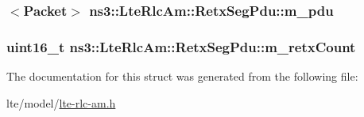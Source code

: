 \subsubsection[{\texorpdfstring{m\+\_\+pdu}{m_pdu}}]{$<${\bf Packet}$>$ ns3\+::\+Lte\+Rlc\+Am\+::\+Retx\+Seg\+Pdu\+::m\+\_\+pdu}\hypertarget{structns3_1_1LteRlcAm_1_1RetxSegPdu_a5b82b2a8a14f319c522890d652721e2f}{}\label{structns3_1_1LteRlcAm_1_1RetxSegPdu_a5b82b2a8a14f319c522890d652721e2f}
\subsubsection[{\texorpdfstring{m\+\_\+retx\+Count}{m_retxCount}}]{\setlength{\rightskip}{0pt plus 5cm}uint16\+\_\+t ns3\+::\+Lte\+Rlc\+Am\+::\+Retx\+Seg\+Pdu\+::m\+\_\+retx\+Count}\hypertarget{structns3_1_1LteRlcAm_1_1RetxSegPdu_ac417ddd810826154a26b6871e80d8498}{}\label{structns3_1_1LteRlcAm_1_1RetxSegPdu_ac417ddd810826154a26b6871e80d8498}


The documentation for this struct was generated from the following file\+:\begin{DoxyCompactItemize}
\item 
lte/model/\hyperlink{lte-rlc-am_8h}{lte-\/rlc-\/am.\+h}\end{DoxyCompactItemize}
